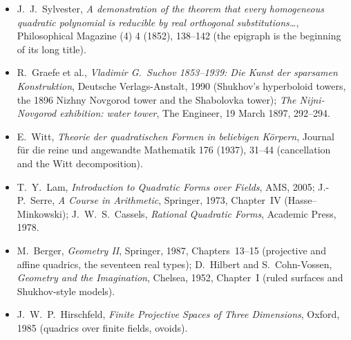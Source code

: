 \begin{itemize}
\item J.~J.~Sylvester, \emph{A demonstration of the theorem that every homogeneous quadratic polynomial is reducible by real orthogonal
substitutions\dots}, Philosophical Magazine (4) 4 (1852), 138--142 (the epigraph is the beginning of its long title).
\item R.~Graefe et al., \emph{Vladimir G.~Suchov 1853--1939: Die Kunst der sparsamen Konstruktion}, Deutsche
Verlags-Anstalt, 1990 (Shukhov's hyperboloid towers, the 1896 Nizhny Novgorod tower and the Shabolovka tower); \emph{The Nijni-Novgorod exhibition:
water tower}, The Engineer, 19 March 1897, 292--294.
\item E.~Witt, \emph{Theorie der quadratischen Formen in beliebigen K\"orpern}, Journal f\"ur die reine und angewandte Mathematik 176 (1937), 31--44
(cancellation and the Witt decomposition).
\item T.~Y.~Lam, \emph{Introduction to Quadratic Forms over Fields}, AMS, 2005; J.-P.~Serre, \emph{A Course in Arithmetic}, Springer, 1973, Chapter~IV
(Hasse--Minkowski); J.~W.~S.~Cassels, \emph{Rational Quadratic Forms}, Academic Press, 1978.
\item M.~Berger, \emph{Geometry II}, Springer, 1987, Chapters~13--15 (projective and affine quadrics, the seventeen real types); D.~Hilbert and
S.~Cohn-Vossen, \emph{Geometry and the Imagination}, Chelsea, 1952, Chapter~I (ruled surfaces and Shukhov-style models).
\item J.~W.~P.~Hirschfeld, \emph{Finite Projective Spaces of Three Dimensions}, Oxford, 1985 (quadrics over finite fields, ovoids).
\end{itemize}
